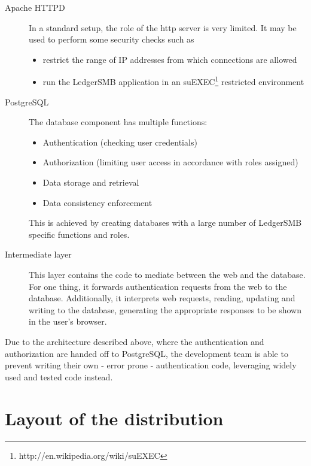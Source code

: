 \begin{description}
\item[Apache HTTPD] In a standard setup, the role of the http server is very limited. It
may be used to perform some security checks such as
\begin{itemize}
\item restrict the range of IP addresses from which connections are allowed
\item run the LedgerSMB application in an
suEXEC\footnote{http://en.wikipedia.org/wiki/suEXEC} restricted environment
\end{itemize}
\item[PostgreSQL] The database component has multiple functions:
\begin{itemize}
\item Authentication (checking user credentials)
\item Authorization (limiting user access in accordance with roles assigned)
\item Data storage and retrieval
\item Data consistency enforcement
\end{itemize}
This is achieved by creating databases with a large number of LedgerSMB specific
functions and roles.
\item[Intermediate layer] This layer contains the code to mediate between the web
and the database.  For one thing, it forwards authentication requests from the web
to the database.  Additionally, it interprets web requests, reading, updating and
writing to the database, generating the appropriate responses to be shown in the
user's browser.
\end{description}

Due to the architecture described above, where the authentication and authorization
are handed off to PostgreSQL, the development team is able to prevent writing their
own - error prone - authentication code, leveraging widely used and tested code instead.

\section{Layout of the distribution}


